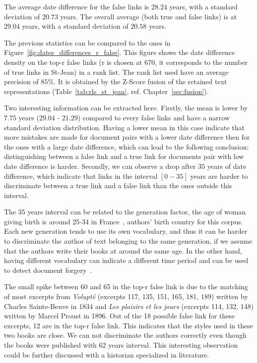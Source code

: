 The average date difference for the false links is $28.24$ years, with a standard deviation of $20.73$ years.
The overall average (both true and false links) is at $29.04$ years, with a standard deviation of $20.58$ years.

The previous statistics can be compared to the ones in Figure~\ref{fig:dates_differences_r_false}.
This figure shows the date difference density on the top-r false links (r is chosen at 670, it corresponds to the number of true links in St-Jean) in a rank list.
The rank list used have an average precision of $85\%$.
It is obtained by the Z-Score fusion of the retained text representations (Table~\ref{tab:rls_st_jean}, ref. Chapter~\ref{sec:fusion}).

Two interesting information can be extracted here.
Firstly, the mean is lower by $7.75$ years ($29.04$ - $21.29$) compared to every false links and have a narrow standard deviation distribution.
Having a lower mean in this case indicate that more mistakes are made for document pairs with a lower date difference then for the ones with a large date difference, which can lead to the following conclusion: distinguishing between a false link and a true link for documents pair with low date difference is harder.
Secondly, we can observe a drop after $35$ years of date difference, which indicate that links in the interval $\left[0-35\right]$ years are harder to discriminate between a true link and a false link than the ones outside this interval.

The 35 years interval can be related to the generation factor, the age of woman giving birth is around 25-34 in France~\cite{generations}, authors' birth country for this corpus.
Each new generation tends to use its own vocabulary, and thus it can be harder to discriminate the author of text belonging to the same generation, if we assume that the authors write their books at around the same age.
In the other hand, having different vocabulary can indicate a different time period and can be used to detect document forgery~\cite{savoy_stylo}.

The small spike between 60 and 65 in the top-r false link is due to the matching of most excerpts from \textit{Volupté} (excerpts 117, 135, 151, 165, 181, 189) written by Charles Sainte-Beuve in 1834 and \textit{Les plaisirs et les jours} (excerpts 114, 132, 148) written by Marcel Proust in 1896.
Out of the 18 possible false link for these excerpts, 12 are in the top-r false link.
This indicates that the styles used in these two books are close.
We can not discriminate the authors correctly even though the books were published with 62 years interval.
This interesting observation could be further discussed with a historian specialized in literature.

